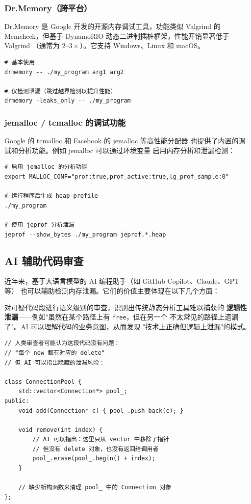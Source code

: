 \documentclass[12pt,a4paper,fontset=fandol]{ctexbook}
\begin{document}
\subsubsection*{Dr.Memory（跨平台）}

Dr.Memory 是 Google 开发的开源内存调试工具，功能类似 Valgrind 的
Memcheck，但基于 DynamoRIO 动态二进制插桩框架，性能开销显著低于 Valgrind
（通常为 $2$--$3\times$）。它支持 Windows、Linux 和 macOS。

\begin{lstlisting}[style=bashstyle, caption={Dr.Memory 使用}]
# 基本使用
drmemory -- ./my_program arg1 arg2

# 仅检测泄漏（跳过越界检测以提升性能）
drmemory -leaks_only -- ./my_program
\end{lstlisting}

\subsubsection*{jemalloc / tcmalloc 的调试功能}

Google 的 tcmalloc 和 Facebook 的 jemalloc 等高性能分配器
也提供了内置的调试和分析功能。例如 jemalloc 可以通过环境变量
启用内存分析和泄漏检测：

\begin{lstlisting}[style=bashstyle, caption={jemalloc 泄漏分析}]
# 启用 jemalloc 的分析功能
export MALLOC_CONF="prof:true,prof_active:true,lg_prof_sample:0"

# 运行程序后生成 heap profile
./my_program

# 使用 jeprof 分析泄漏
jeprof --show_bytes ./my_program jeprof.*.heap
\end{lstlisting}

\subsection{AI 辅助代码审查}

近年来，基于大语言模型的 AI 编程助手（如 GitHub Copilot、Claude、GPT 等）
也可以辅助检测内存泄漏。它们的价值主要体现在以下几个方面：

对可疑代码段进行语义级别的审查，识别出传统静态分析工具难以捕获的
\textbf{逻辑性泄漏}——例如"虽然在某个路径上有 \texttt{free}，但在另一个
不太常见的路径上遗漏了"。AI 可以理解代码的业务意图，从而发现
"技术上正确但逻辑上泄漏"的模式。

\begin{lstlisting}[style=cppstyle, caption={AI 辅助识别逻辑泄漏示例}]
// 人类审查者可能认为这段代码没有问题：
// "每个 new 都有对应的 delete"
// 但 AI 可以指出隐藏的泄漏风险：

class ConnectionPool {
    std::vector<Connection*> pool_;
public:
    void add(Connection* c) { pool_.push_back(c); }

    void remove(int index) {
        // AI 可以指出：这里只从 vector 中移除了指针
        // 但没有 delete 对象，也没有返回给调用者
        pool_.erase(pool_.begin() + index);
    }

    // 缺少析构函数来清理 pool_ 中的 Connection 对象
};
\end{lstlisting}
\end{document}
